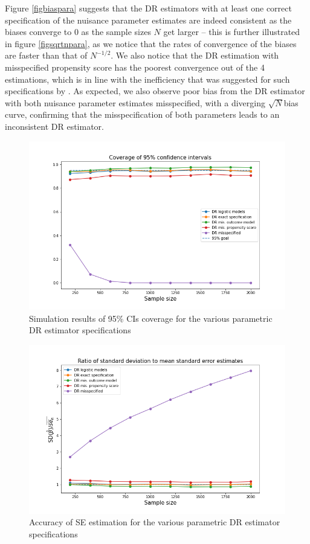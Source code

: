 \documentclass[12pt,twoside]{article}
\begin{document}
Figure \ref{figbiaspara} suggests that the DR estimators with at least one correct specification of the nuisance parameter estimates are indeed consistent as the biases converge to 0 as the sample sizes $N$ get larger -- this is further illustrated in figure \ref{figsqrtnpara}, as we notice that the rates of convergence of the biases are faster than that of $N^{-1/2}$. We also notice that the DR estimation with misspecified propensity score has the poorest convergence out of the 4 estimations, which is in line with the inefficiency that was suggested for such specifications by \citet{kang}. As expected, we also observe poor bias from the DR estimator with both nuisance parameter estimates misspecified, with a diverging $\sqrt{N}$bias curve, confirming that the misspecification of both parameters leads to an inconsistent DR estimator.

\begin{figure}[h!]
    \centering
    \includegraphics[width = 0.9\columnwidth]{figures/CIpara.png}
    \caption{Simulation results of 95\% CIs coverage for the various parametric DR estimator specifications}
    \label{figCIpara}
\end{figure}

\begin{figure}[h!]
    \centering
    \includegraphics[width = 0.9\columnwidth]{figures/SEpara.png}
    \caption{Accuracy of \citet{lunceford_davidian} SE estimation for the various parametric DR estimator specifications}
    \label{figSEpara}
\end{figure}
\end{document}
